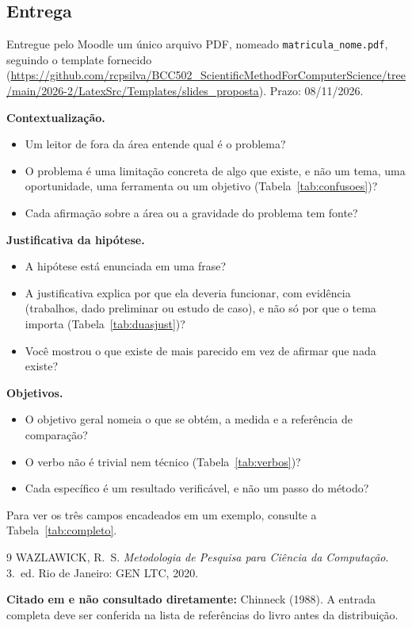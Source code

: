 \documentclass[10pt,a4paper]{extarticle}
\newcommand{\prazo}{\textcolor{red!70!black}{08/11/2026}}
\theoremstyle{definition}
\begin{document}
\subsection{Entrega}

Entregue pelo Moodle um único arquivo PDF, nomeado \texttt{matricula\_nome.pdf}, seguindo o template fornecido (\url{https://github.com/rcpsilva/BCC502_ScientificMethodForComputerScience/tree/main/2026-2/LatexSrc/Templates/slides_proposta}). Prazo: \prazo.

\begin{keybox}
\textbf{Contextualização.}
\begin{itemize}
  \item Um leitor de fora da área entende qual é o problema?
  \item O problema é uma limitação concreta de algo que existe, e não um tema, uma oportunidade, uma ferramenta ou um objetivo (Tabela~\ref{tab:confusoes})?
  \item Cada afirmação sobre a área ou a gravidade do problema tem fonte?
\end{itemize}
\textbf{Justificativa da hipótese.}
\begin{itemize}
  \item A hipótese está enunciada em uma frase?
  \item A justificativa explica por que ela deveria funcionar, com evidência (trabalhos, dado preliminar ou estudo de caso), e não só por que o tema importa (Tabela~\ref{tab:duasjust})?
  \item Você mostrou o que existe de mais parecido em vez de afirmar que nada existe?
\end{itemize}
\textbf{Objetivos.}
\begin{itemize}
  \item O objetivo geral nomeia o que se obtém, a medida e a referência de comparação?
  \item O verbo não é trivial nem técnico (Tabela~\ref{tab:verbos})?
  \item Cada específico é um resultado verificável, e não um passo do método?
\end{itemize}
Para ver os três campos encadeados em um exemplo, consulte a Tabela~\ref{tab:completo}.
\end{keybox}

\begin{thebibliography}{9}
 WAZLAWICK, R.\ S. \emph{Metodologia de Pesquisa para Ciência da Computação}. 3.\ ed. Rio de Janeiro: GEN LTC, 2020.
\end{thebibliography}

\textbf{Citado em \cite{wazlawick2020} e não consultado diretamente:} Chinneck (1988). A entrada completa deve ser conferida na lista de referências do livro antes da distribuição.
\end{document}
